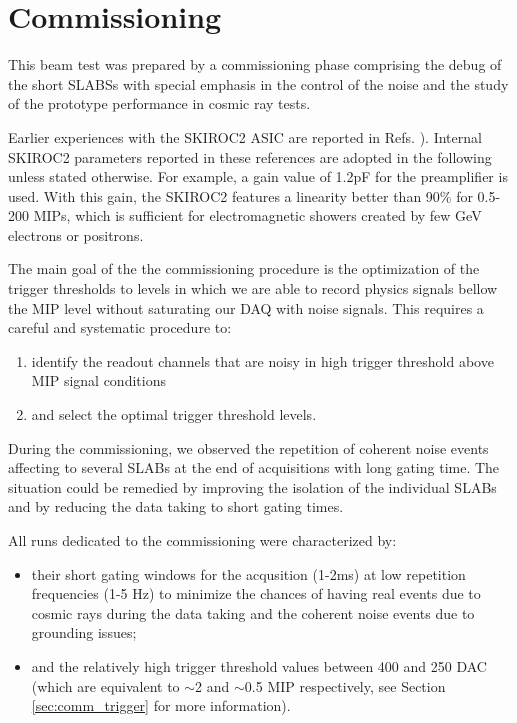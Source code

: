 \documentclass[a4paper,11pt]{article}
\begin{document}
\section{Commissioning}
\label{sec:commissioning}

This beam test was prepared by a commissioning phase comprising
the debug of the
short SLABSs with special emphasis in the control of the noise and the study of the
prototype performance in cosmic ray tests.

Earlier experiences with the SKIROC2 ASIC are reported in
Refs. \cite{Amjad:2014tha,Suehara:2018mqk}). 
Internal SKIROC2 parameters reported in these references are adopted in the following
unless stated otherwise.
For example, a gain value of 1.2pF for the preamplifier is used. 
With this gain, the SKIROC2 features a linearity better than 90\% 
for 0.5-200 MIPs, which is sufficient for 
electromagnetic showers created by few GeV 
electrons or positrons.

The main goal of the the commissioning  procedure is 
the optimization of the trigger thresholds to levels in which we are able
to record physics signals bellow the MIP level without saturating our DAQ with
noise signals. This requires a careful and systematic procedure to:

\begin{enumerate}
  \item identify the readout channels that are noisy in high trigger threshold above MIP signal conditions
  \item and select the optimal trigger threshold levels.
\end{enumerate}

During the commissioning, we observed the repetition of coherent noise events affecting to several
SLABs at the end of acquisitions with long gating time. The situation
could be remedied by improving the isolation of the individual SLABs and by reducing the
data taking to short gating times.

All runs dedicated to the commissioning were characterized by:
\begin{itemize}
  \item their short gating windows for the acqusition (1-2ms)
   at low repetition frequencies (1-5 Hz) to minimize the chances of having real events due to cosmic rays during the data taking and the coherent noise events due to grounding issues;
 \item and the relatively high trigger threshold values between 400 and 250 DAC 
(which are equivalent to $\sim$2 and $\sim$0.5 MIP respectively, see Section \ref{sec:comm_trigger} for more information).
\end{itemize}
\end{document}
